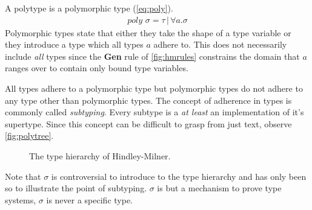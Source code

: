 \documentclass[11pt,oneside,a4paper]{report}
\begin{document}
A polytype is a polymorphic type (\autoref{eq:poly}).
\begin{align}
	poly \,\, \sigma = \tau \,|\, \forall a . \sigma
	\label{eq:poly}
\end{align}
Polymorphic types state that either they take the shape of a type variable or they introduce a type which all types $a$ adhere to. 
This does not necessarily include \textit{all} types since the \textbf{Gen} rule of \autoref{fig:hmrules} constrains the domain that $a$ ranges over to contain only bound type variables.
\begin{remark}
    All types adhere to a polymorphic type but polymorphic types do not adhere to any type other than polymorphic types.
    The concept of adherence in types is commonly called \textit{subtyping}.
    Every subtype is a \textit{at least} an implementation of it's supertype.
    Since this concept can be difficult to grasp from just text, observe \autoref{fig:polytree}.
    \begin{figure}[ht]
        \centering
        \caption{The type hierarchy of Hindley-Milner.}
        \label{fig:polytree}
    \end{figure}
    Note that $\sigma$ is controversial to introduce to the type hierarchy and has only been so to illustrate the point of subtyping.
    $\sigma$ is but a mechanism to prove type systems, $\sigma$ is never a specific type.

\end{remark}
\end{document}
